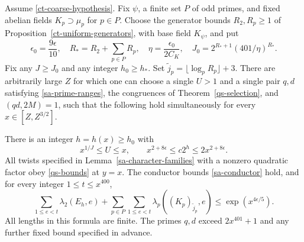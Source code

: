 \begin{proposition}\label{sa-compatible-interval}
Assume \eqref{ct-coarse-hypothesis}.
Fix $\psi$, a finite set $P$ of odd primes, and fixed abelian fields
$K_p\supset\mu_p$ for $p\in P$. Choose the generator bounds
$R_2,R_p\ge1$ of Proposition~\ref{ct-uniform-generators}, with
base field $K_\psi$, and put
\[
 \epsilon_0=\frac{9\epsilon}{10},\quad
 R_*=R_2+\sum_{p\in P}R_p,\quad
 \eta=\frac{\epsilon_0}{2C_K},\quad
 J_0=2^{R_*+1}(401/\eta)^{R_*}.
\]
Fix any $J\ge J_0$ and any integer $h_0\ge h_*$.
Set $\widetilde j_p=\lfloor\log_pR_p\rfloor+3$.
There are arbitrarily large $Z$ for which one can choose a single
$U>1$ and a single pair $q,d$ satisfying
\eqref{sa-prime-ranges}, the congruences of
Theorem~\ref{qs-selection}, and $(qd,2M)=1$, such that the following
hold simultaneously for every $x\in[Z,Z^{3/2}]$.

There is an integer $h=h(x)\ge h_0$ with
\begin{equation}\label{sa-rank-window}
 x^{1/J}\le U\le x,\qquad
 x^{2+8\epsilon}\le c2^h\le2x^{2+8\epsilon}.
\end{equation}
All twists specified in Lemma~\ref{sa-character-families} with a
nonzero quadratic factor obey \eqref{qs-bounds} at $y=x$.
The conductor bounds \eqref{sa-conductor} hold, and for every
integer $1\le t\le x^{400}$,
\begin{equation}\label{sa-partial-cohomology}
 \sum_{1\le e<t}\lambda_2(E_h,e)
 +\sum_{p\in P}\sum_{1\le e<t}
              \lambda_p((K_p)_{\widetilde j_p},e)
       \le \exp(x^{4\epsilon/5}).
\end{equation}
All lengths in this formula are finite. The primes $q,d$ exceed
$2x^{401}+1$ and any further fixed bound specified in advance.
\end{proposition}

